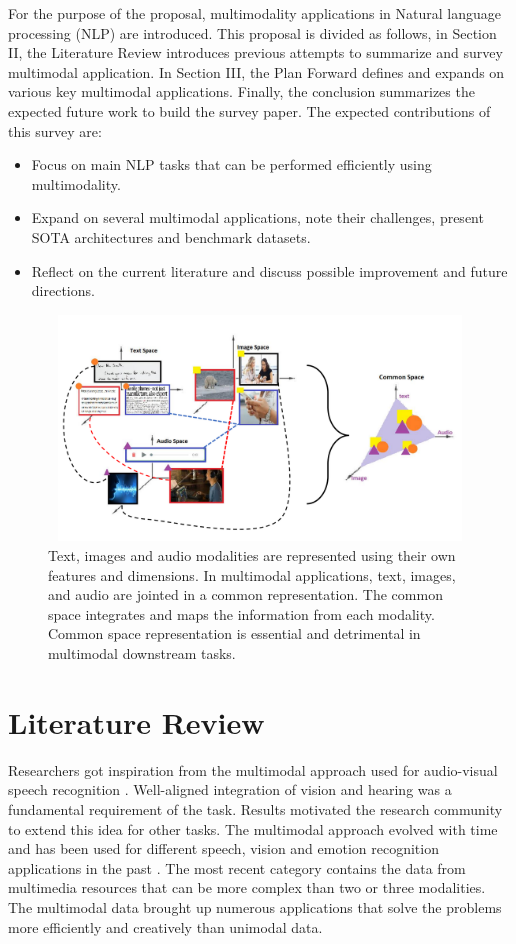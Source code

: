 \documentclass[conference]{IEEEtran}
\begin{document}
 For the purpose of the proposal, multimodality applications in Natural language processing (NLP) are introduced. This proposal is divided as follows, in Section II, the Literature Review introduces previous attempts to summarize and survey multimodal application. In Section III, the Plan Forward defines and expands on various key multimodal applications. Finally, the conclusion summarizes the expected future work to build the survey paper.  
 The expected contributions of this survey are: 
 \begin{itemize} 
 \item Focus on main NLP tasks that can be performed efficiently using multimodality. 
    \item Expand on several multimodal applications, note their challenges, present SOTA architectures and benchmark datasets. 
    \item Reflect on the current literature and discuss possible improvement and future directions. 
 \end{itemize} 
\begin{figure}
    \centering
  \includegraphics[width=14cm,height=6cm]{Presentation1.pdf}
  \caption{Text, images and audio modalities are represented using their own features and dimensions. In multimodal applications, text, images, and audio are jointed in a common representation. The common space integrates and maps the information from each modality. Common space representation is essential and detrimental in multimodal downstream tasks.}
\end{figure}

\section{Literature Review}
Researchers got inspiration from the multimodal approach used for audio-visual speech recognition \cite{mcgurk1976hearing}. Well-aligned integration of vision and hearing was a fundamental requirement of the task. Results motivated the research community to extend this idea for other tasks. The multimodal approach evolved with time and has been used for different speech, vision and emotion recognition applications in the past \cite{baltruvsaitis2018multimodal}. The most recent category contains the data from multimedia resources that can be more complex than two or three modalities. The multimodal data brought up numerous applications that solve the problems more efficiently and creatively than unimodal data. 
\end{document}
